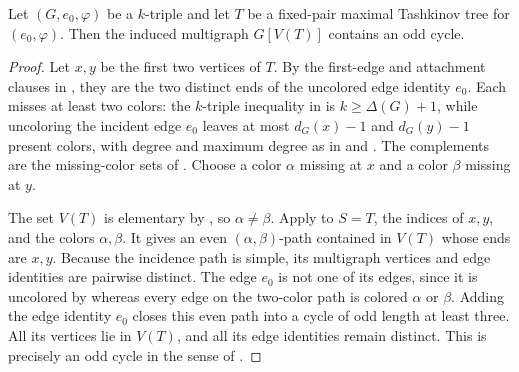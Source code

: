 \begin{lemma}
Let $(G,e_0,\varphi)$ be a $k$-triple and let $T$ be a fixed-pair maximal
Tashkinov tree for $(e_0,\varphi)$.  Then the induced multigraph $G[V(T)]$
contains an odd cycle.
\end{lemma}
\begin{proof}
Let $x,y$ be the first two vertices of $T$.  By the first-edge and
attachment clauses in , they are the two distinct
ends of the uncolored edge identity $e_0$.  Each misses at least two colors:
the $k$-triple inequality in  is
$k\geq\Delta(G)+1$, while uncoloring the incident edge $e_0$ leaves at
most $d_G(x)-1$ and $d_G(y)-1$ present colors, with degree and maximum
degree as in  and .  The complements
are the missing-color sets of .  Choose a color $\alpha$
missing at $x$ and a color $\beta$ missing at $y$.

The set $V(T)$ is elementary by
, so $\alpha\ne\beta$.
Apply  to $S=T$, the indices of $x,y$,
and the colors $\alpha,\beta$.  It gives an even
$(\alpha,\beta)$-path contained in $V(T)$ whose ends are $x,y$.  Because
the incidence path is simple, its multigraph vertices and edge identities
are pairwise distinct.  The edge $e_0$ is not one of its edges, since it is
uncolored by  whereas every edge on the two-color path is
colored $\alpha$ or $\beta$.  Adding the edge identity $e_0$ closes this
even path into a cycle of odd length at least three.  All its vertices lie
in $V(T)$, and all its edge identities remain distinct.  This is precisely
an odd cycle in the sense of .
\end{proof}
